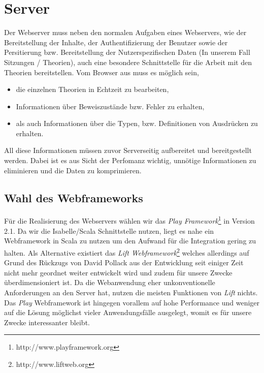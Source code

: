 \section{Server}

Der Webserver muss neben den normalen Aufgaben eines Webservers, wie der Bereitstellung der Inhalte,
der Authentifizierung der Benutzer sowie der Persitierung bzw. Bereitstellung der Nutzerspezifischen
Daten (In unserem Fall Sitzungen / Theorien), auch eine besondere Schnittstelle für die Arbeit mit
den Theorien bereitstellen. Vom Browser aus muss es möglich sein, 

\begin{itemize}
  \item die einzelnen Theorien in Echtzeit zu bearbeiten,
  \item Informationen über Beweiszustände bzw. Fehler zu erhalten,
  \item als auch Informationen über die Typen, bzw. Definitionen von Ausdrücken zu erhalten.
\end{itemize}

All diese Informationen müssen zuvor Serverseitig aufbereitet und bereitgestellt werden. Dabei ist
es aus Sicht der Perfomanz wichtig, unnötige Informationen zu eliminieren und die Daten zu
komprimieren.


\subsection{Wahl des Webframeworks}

Für die Realisierung des Webservers wählen wir das \textit{Play
Framework}\footnote{http://www.playframework.org} in Version 2.1. Da wir die Isabelle/Scala
Schnittstelle nutzen, liegt es nahe ein Webframework in Scala zu nutzen um den Aufwand für die
Integration gering zu halten. Als Alternative existiert das \textit{Lift
Webframework}\footnote{http://www.liftweb.org} welches allerdings auf Grund des Rückzugs von David
Pollack aus der Entwicklung seit einiger Zeit nicht mehr geordnet weiter entwickelt wird und zudem
für unsere Zwecke überdimensioniert ist. Da die Webanwendung eher unkonventionelle Anforderungen an
den Server hat, nutzen die meisten Funktionen von \textit{Lift} nichts. Das \textit{Play}
Webframework ist hingegen vorallem auf hohe Performance und weniger auf die Lösung möglichst vieler
Anwendungsfälle ausgelegt, womit es für unsere Zwecke interessanter bleibt.

